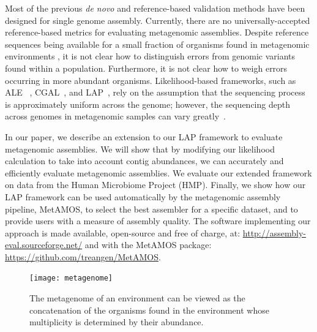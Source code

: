 Most of the previous \emph{de novo} and reference-based validation methods have been designed for single genome assembly.
Currently, there are no universally-accepted reference-based metrics for evaluating metagenomic assemblies.
Despite reference sequences being available for a small fraction of organisms found in metagenomic environments \cite{angly2006marine,dinsdale2008functional}, it is not clear how to distinguish errors from genomic variants found within a population.
Furthermore, it is not clear how to weigh errors occurring in more abundant organisms.
Likelihood-based frameworks, such as ALE ~\cite{clark2013ale}, CGAL~\cite{rahman2013cgal}, and LAP~\cite{LAP}, rely on the assumption that the sequencing process is approximately uniform across the genome; however, the sequencing depth across genomes in metagenomic samples can vary greatly~\cite{carrigg2007dna,krsek1999comparison,morgan2010metagenomic,temperton2009bias}.


In our paper, we describe an extension to our LAP framework to evaluate metagenomic assemblies.
We will show that by modifying our likelihood calculation to take into account contig abundances, we can accurately and efficiently evaluate metagenomic assemblies.
We evaluate our extended framework on data from the Human Microbiome Project (HMP).
Finally, we show how our LAP framework can be used automatically by the metagenomic assembly pipeline, MetAMOS\cite{treangen2013metamos}, to select the best assembler for a specific dataset, and to provide users with a measure of assembly quality.
The software implementing our approach is made available, open-source and free of charge, at: \url{http://assembly-eval.sourceforge.net/} and with the MetAMOS package: \url{https://github.com/treangen/MetAMOS}.



\begin{figure}
\begin{center}
\texttt{[image: metagenome]}
\end{center}
\renewcommand{\baselinestretch}{1}
\small\normalsize
\begin{quote}
\caption[The metagenome of an environment]{The metagenome of an environment can be viewed as the concatenation of the organisms found in the environment whose multiplicity is determined by their abundance. \label{fig:metagenome}}
\end{quote}
\end{figure}
\renewcommand{\baselinestretch}{2}
\small\normalsize
\newpage


